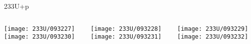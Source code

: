 \documentclass[10pt]{beamer}
\begin{document}
\begin{frame}{233U+p}
	\begin{columns}
		\begin{column}{0.3\textwidth}
			\begin{overlayarea}{\textwidth}{\textheight}
				\centering	    
			   	\vspace{-0.1\textheight}
			   	\texttt{[image: 233U/093227]}\\
				\vspace{0.05\textheight}		
				\texttt{[image: 233U/093230]}
			\end{overlayarea}
		\end{column}
		\begin{column}{0.3\textwidth}
			\begin{overlayarea}{\textwidth}{\textheight}
				\centering	    
			   	\vspace{-0.1\textheight}
			   	\texttt{[image: 233U/093228]}\\
				\vspace{0.05\textheight}				
				\texttt{[image: 233U/093231]}
			\end{overlayarea}
		\end{column}
		\begin{column}{0.3\textwidth}
			\begin{overlayarea}{\textwidth}{\textheight}
				\centering	    
			   	\vspace{-0.1\textheight}
			   	\texttt{[image: 233U/093229]}\\
				\vspace{0.05\textheight}				
				\texttt{[image: 233U/093232]}
			\end{overlayarea}	
		\end{column}
	\end{columns}
\end{frame}
\end{document}
